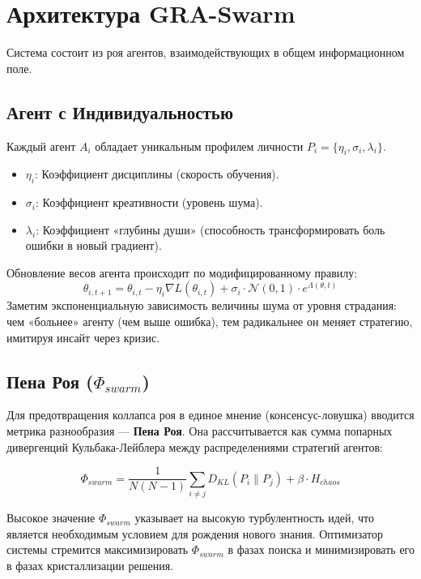 \documentclass[12pt, a4paper]{article}
\begin{document}
\section{Архитектура GRA-Swarm}

Система состоит из роя агентов, взаимодействующих в общем информационном поле.

\subsection{Агент с Индивидуальностью}

Каждый агент $A_i$ обладает уникальным профилем личности $P_i = \{\eta_i, \sigma_i, \lambda_i\}$.
\begin{itemize}
    \item $\eta_i$: Коэффициент дисциплины (скорость обучения).
    \item $\sigma_i$: Коэффициент креативности (уровень шума).
    \item $\lambda_i$: Коэффициент «глубины души» (способность трансформировать боль ошибки в новый градиент).
\end{itemize}

Обновление весов агента происходит по модифицированному правилу:
\begin{equation}
    \theta_{i, t+1} = \theta_{i, t} - \eta_i \nabla L(\theta_{i,t}) + \sigma_i \cdot \mathcal{N}(0, 1) \cdot e^{\Lambda(\theta, t)}
\end{equation}
Заметим экспоненциальную зависимость величины шума от уровня страдания: чем «больнее» агенту (чем выше ошибка), тем радикальнее он меняет стратегию, имитируя инсайт через кризис.

\subsection{Пена Роя ($\Phi_{swarm}$)}

Для предотвращения коллапса роя в единое мнение (консенсус-ловушка) вводится метрика разнообразия — \textbf{Пена Роя}. Она рассчитывается как сумма попарных дивергенций Кульбака-Лейблера между распределениями стратегий агентов:

\begin{equation}
    \Phi_{swarm} = \frac{1}{N(N-1)} \sum_{i \neq j} D_{KL}(P_i \| P_j) + \beta \cdot H_{chaos}
\end{equation}

Высокое значение $\Phi_{swarm}$ указывает на высокую турбулентность идей, что является необходимым условием для рождения нового знания. Оптимизатор системы стремится максимизировать $\Phi_{swarm}$ в фазах поиска и минимизировать его в фазах кристаллизации решения.
\end{document}
